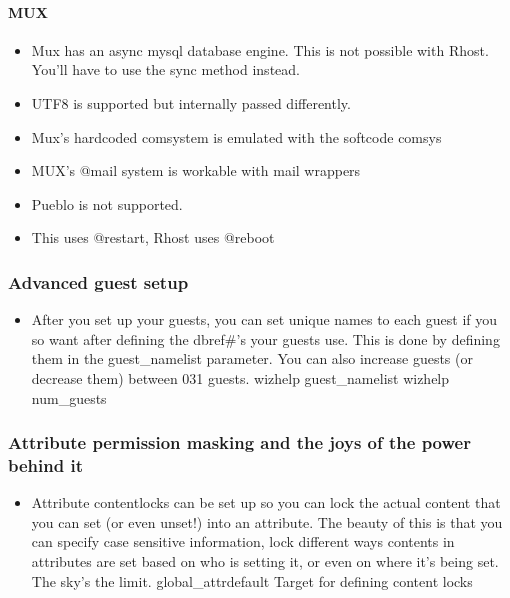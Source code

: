 \documentclass[letterpaper,10pt,english]{sphinxmanual}
\begin{document}
\paragraph{MUX}
\label{\detokenize{features:mux}}\begin{itemize}
\item {} 
\sphinxAtStartPar
Mux has an async mysql database engine.  This is not possible
with Rhost.  You’ll have to use the sync method instead.

\item {} 
\sphinxAtStartPar
UTF8 is supported but internally passed differently.

\item {} 
\sphinxAtStartPar
Mux’s hardcoded comsystem is emulated with the softcode comsys

\item {} 
\sphinxAtStartPar
MUX’s @mail system is workable with mail wrappers

\item {} 
\sphinxAtStartPar
Pueblo is not supported.

\item {} 
\sphinxAtStartPar
This uses @restart, Rhost uses @reboot

\end{itemize}


\subsubsection{Advanced guest setup}
\label{\detokenize{features:advanced-guest-setup}}\begin{itemize}
\item {} 
\sphinxAtStartPar
After you set up your guests, you can set unique names to each guest
if you so want after defining the dbref\#’s your guests use.  This is
done by defining them in the guest\_namelist parameter.  You can also
increase guests (or decrease them) between 0\sphinxhyphen{}31 guests.
\sphinxhyphen{} wizhelp guest\_namelist
\sphinxhyphen{} wizhelp num\_guests

\end{itemize}


\subsubsection{Attribute permission masking and the joys of the power behind it}
\label{\detokenize{features:attribute-permission-masking-and-the-joys-of-the-power-behind-it}}\begin{itemize}
\item {} 
\sphinxAtStartPar
Attribute contentlocks can be set up so you can lock the actual
content that you can set (or even unset!) into an attribute.
The beauty of this is that you can specify case sensitive
information, lock different ways contents in attributes are set
based on who is setting it, or even on where it’s being set.
The sky’s the limit.
\sphinxhyphen{} global\_attrdefault    \sphinxhyphen{} Target for defining content locks

\end{itemize}
\end{document}
